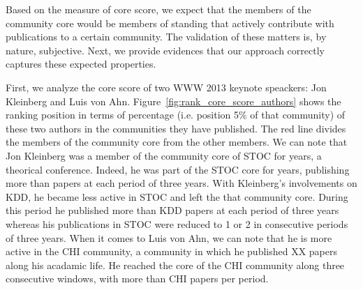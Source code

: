 Based on the measure of core score, we expect that the members of the community core would be members of standing that actively contribute with publications to a certain community.
The validation of these matters is, by nature, subjective.  Next, we provide evidences that our approach correctly captures these expected properties. 

First, we analyze the core score of two WWW 2013 keynote speackers: Jon Kleinberg and Luis von Ahn.  Figure~\ref{fig:rank_core_score_authors} shows the ranking position in terms of
percentage (i.e. position 5\% of that community) of these two authors in the communities they have published. The red line divides the members of the community core from the other
members. We can note that Jon Kleinberg was a member of the community core of STOC for years, a theorical conference. Indeed, he was part of the STOC core for  years,
publishing more than  papers at each period of three years. With Kleinberg's involvements on KDD, he became less active in STOC and left the that community core. During
this period he published more than  KDD papers at each period of three years whereas his publications in STOC were reduced to 1 or 2 in  consecutive periods of
three years. When it comes to Luis von Ahn, we can note that he is more active in the CHI community, a community in which he published XX papers along his acadamic life. He reached
the core of the CHI community along three consecutive windows, with more than  CHI papers per period. 

